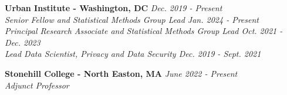 
\textbf{Urban Institute - Washington, DC} \hfill \textit{Dec. 2019 - Present}\\
    \textit{Senior Fellow and Statistical Methods Group Lead \hfill Jan. 2024 - Present}\\
    \textit{Principal Research Associate and Statistical Methods Group Lead \hfill Oct. 2021 - Dec. 2023}\\
    \textit{Lead Data Scientist, Privacy and Data Security \hfill Dec. 2019 - Sept. 2021}

\workspace
    \textbf{Stonehill College - North Easton, MA} \hfill \textit{June 2022 - Present}\\
    \textit{Adjunct Professor}

